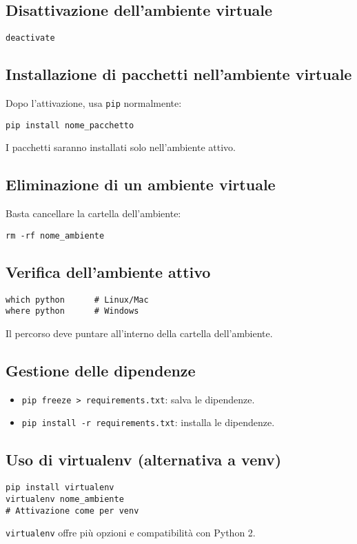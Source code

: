 \documentclass[a4paper,12pt]{article}
\begin{document}
\subsection*{Disattivazione dell'ambiente virtuale}
\begin{lstlisting}
deactivate
\end{lstlisting}

\subsection*{Installazione di pacchetti nell'ambiente virtuale}
Dopo l'attivazione, usa \texttt{pip} normalmente:
\begin{lstlisting}
pip install nome_pacchetto
\end{lstlisting}
I pacchetti saranno installati solo nell'ambiente attivo.

\subsection*{Eliminazione di un ambiente virtuale}
Basta cancellare la cartella dell'ambiente:
\begin{lstlisting}
rm -rf nome_ambiente
\end{lstlisting}

\subsection*{Verifica dell'ambiente attivo}
\begin{lstlisting}
which python      # Linux/Mac
where python      # Windows
\end{lstlisting}
Il percorso deve puntare all'interno della cartella dell'ambiente.

\subsection*{Gestione delle dipendenze}
\begin{itemize}
    \item \texttt{pip freeze > requirements.txt}: salva le dipendenze.
    \item \texttt{pip install -r requirements.txt}: installa le dipendenze.
\end{itemize}

\subsection*{Uso di virtualenv (alternativa a venv)}
\begin{lstlisting}
pip install virtualenv
virtualenv nome_ambiente
# Attivazione come per venv
\end{lstlisting}
\texttt{virtualenv} offre più opzioni e compatibilità con Python 2.
\end{document}
